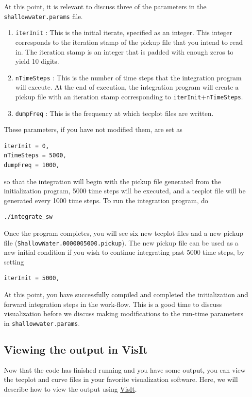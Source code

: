 \documentclass{softwaremanual}
\begin{document}
At this point, it is relevant to discuss three of the parameters in the \texttt{shallowwater.params} file.
\begin{enumerate}
\item \texttt{iterInit} : This is the initial iterate, specified as an integer. This integer corresponds to the iteration stamp of the pickup file that you intend to read in. The iteration stamp is an integer that is padded with enough zeros to yield 10 digits.
\item \texttt{nTimeSteps} : This is the number of time steps that the integration program will execute. At the end of execution, the integration program will create a pickup file with an iteration stamp corresponding to \texttt{iterInit}+\texttt{nTimeSteps}.
\item \texttt{dumpFreq} : This is the frequency at which tecplot files are written.
\end{enumerate} 
These parameters, if you have not modified them, are set as
\begin{verbatim}
iterInit = 0,
nTimeSteps = 5000,
dumpFreq = 1000,
\end{verbatim}
so that the integration will begin with the pickup file generated from the initialization program, 5000 time steps will be executed, and a tecplot file will be generated every 1000 time steps. To run the integration program, do
\begin{verbatim}
./integrate_sw
\end{verbatim}
Once the program completes, you will see six new tecplot files and a new pickup file (\texttt{ShallowWater.0000005000.pickup}). The new pickup file can be used as a new initial condition if you wish to continue integrating past 5000 time steps, by setting 
\begin{verbatim}
iterInit = 5000,
\end{verbatim}

At this point, you have successfully compiled and completed the initialization and forward integration steps in the work-flow. This is a good time to discuss visualization before we discuss making modifications to the run-time parameters in \texttt{shallowwater.params}.

\subsection{Viewing the output in VisIt}
Now that the code has finished running and you have some output, you can view the tecplot and curve files in your favorite visualization software. Here, we will describe how to view the output using \href{https://wci.llnl.gov/simulation/computer-codes/visit/}{VisIt}.
\end{document}
